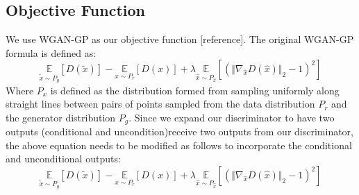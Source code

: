 \subsection{Objective Function}
We use WGAN-GP as our objective function [reference]. The original WGAN-GP formula is defined as:
\begin{equation}
\underset{\tilde{x} \sim P_g}{\mathbb{E}}[D(\tilde{x})] - \underset{x \sim P_r}{\mathbb{E}}[D(x)] + \lambda \underset{\hat{x} \sim P_\hat{x}}{\mathbb{E}}[(\Vert \nabla_\hat{x} D(\hat{x}) \Vert_2 - 1)^2]
\end{equation}
Where $P_x$ is defined as the distribution formed from sampling uniformly along straight lines between pairs of points sampled from the data distribution $P_r$ and the generator distribution $P_g$. Since we expand our discriminator to have two outputs (conditional and uncondition)receive two outputs from our discriminator, the above equation needs to be modified as follows to incorporate the conditional and unconditional outputs:
\begin{equation}
\underset{\tilde{x} \sim P_g}{\mathbb{E}}[D(\tilde{x})] - \underset{x \sim P_r}{\mathbb{E}}[D(x)] + \lambda \underset{\hat{x} \sim P_\hat{x}}{\mathbb{E}}[(\Vert \nabla_\hat{x} D(\hat{x}) \Vert_2 - 1)^2]
\end{equation}